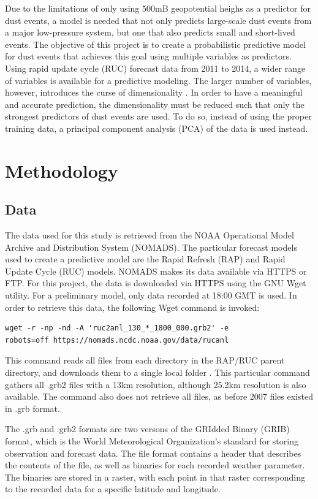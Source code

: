 \documentclass{article}
\begin{document}
Due to the limitations of only using 500mB geopotential heighs as a predictor for dust events, a model is needed that not only predicts large-scale dust events from a major low-pressure system, but one that also predicts small and short-lived events. The objective of this project is to create a probabilistic predictive model for dust events that achieves this goal using multiple variables as predictors. Using rapid update cycle (RUC) forecast data from 2011 to 2014, a wider range of variables is available for a predictive modeling. The larger number of variables, however, introduces the curse of dimensionality \cite{tan}. In order to have a meaningful and accurate prediction, the dimensionality must be reduced such that only the strongest predictors of dust events are used. To do so, instead of using the proper training data, a principal component analysis (PCA) of the data is used instead.
\section{Methodology}
\subsection{Data}
The data used for this study is retrieved from the NOAA Operational Model Archive and Distribution System (NOMADS). The particular forecast models used to create a predictive model are the Rapid Refresh (RAP) and Rapid Update Cycle (RUC) models. NOMADS makes its data available via HTTPS or FTP. For this project, the data is downloaded via HTTPS using the GNU Wget utility. For a preliminary model, only data recorded at 18:00 GMT is used. In order to retrieve this data, the following Wget command is invoked:
\begin{verbatim}
wget -r -np -nd -A 'ruc2anl_130_*_1800_000.grb2' -e 
robots=off https://nomads.ncdc.noaa.gov/data/rucanl
\end{verbatim}

This command reads all files from each directory in the RAP/RUC parent directory, and downloads them to a single local folder \cite{wget}. This particular command gathers all .grb2 files with a 13km resolution, although 25.2km resolution is also available. The command also does not retrieve all files, as before 2007 files existed in .grb format.

The .grb and .grb2 formats are two versons of the GRIdded Binary (GRIB) format, which is the World Meteorological Organization's standard for storing observation and forecast data. The file format contains a header that describes the contents of the file, as well as binaries for each recorded weather parameter. The binaries are stored in a raster, with each point in that raster corresponding to the recorded data for a specific latitude and longitude.
\end{document}
